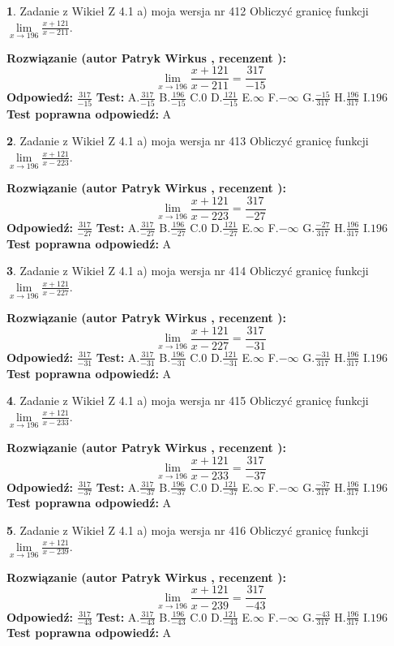 \documentclass[12pt, a4paper]{article}
\theoremstyle{definition} %
\newtheorem{zad}{}
\newcommand{\zadStart}[1]{\begin{zad}#1\newline}
\newcommand{\zadStop}{\end{zad}}
\newcommand{\rozwStart}[2]{\noindent \textbf{Rozwiązanie (autor #1 , recenzent #2): }\newline}
\newcommand{\rozwStop}{\newline}
\newcommand{\odpStart}{\noindent \textbf{Odpowiedź:}\newline}
\newcommand{\odpStop}{\newline}
\newcommand{\testStart}{\noindent \textbf{Test:}\newline}
\newcommand{\testStop}{\newline}
\newcommand{\kluczStart}{\noindent \textbf{Test poprawna odpowiedź:}\newline}
\newcommand{\kluczStop}{\newline}
\begin{document}
\zadStart{Zadanie z Wikieł Z 4.1 a) moja wersja nr 412}
Obliczyć granicę funkcji $\lim\limits_{x\to196}\frac{x+121}{x-211}$.
\zadStop
\rozwStart{Patryk Wirkus}{}
$$\lim\limits_{x\to196}\frac{x+121}{x-211} = \frac{317}{-15}$$
\rozwStop
\odpStart
$\frac{317}{-15}$
\odpStop
\testStart
A.$\frac{317}{-15}$
B.$\frac{196}{-15}$
C.$0$
D.$\frac{121}{-15}$
E.$\infty$
F.$-\infty$
G.$\frac{-15}{317}$
H.$\frac{196}{317}$
I.$196$
\testStop
\kluczStart
A
\kluczStop



\zadStart{Zadanie z Wikieł Z 4.1 a) moja wersja nr 413}
Obliczyć granicę funkcji $\lim\limits_{x\to196}\frac{x+121}{x-223}$.
\zadStop
\rozwStart{Patryk Wirkus}{}
$$\lim\limits_{x\to196}\frac{x+121}{x-223} = \frac{317}{-27}$$
\rozwStop
\odpStart
$\frac{317}{-27}$
\odpStop
\testStart
A.$\frac{317}{-27}$
B.$\frac{196}{-27}$
C.$0$
D.$\frac{121}{-27}$
E.$\infty$
F.$-\infty$
G.$\frac{-27}{317}$
H.$\frac{196}{317}$
I.$196$
\testStop
\kluczStart
A
\kluczStop



\zadStart{Zadanie z Wikieł Z 4.1 a) moja wersja nr 414}
Obliczyć granicę funkcji $\lim\limits_{x\to196}\frac{x+121}{x-227}$.
\zadStop
\rozwStart{Patryk Wirkus}{}
$$\lim\limits_{x\to196}\frac{x+121}{x-227} = \frac{317}{-31}$$
\rozwStop
\odpStart
$\frac{317}{-31}$
\odpStop
\testStart
A.$\frac{317}{-31}$
B.$\frac{196}{-31}$
C.$0$
D.$\frac{121}{-31}$
E.$\infty$
F.$-\infty$
G.$\frac{-31}{317}$
H.$\frac{196}{317}$
I.$196$
\testStop
\kluczStart
A
\kluczStop



\zadStart{Zadanie z Wikieł Z 4.1 a) moja wersja nr 415}
Obliczyć granicę funkcji $\lim\limits_{x\to196}\frac{x+121}{x-233}$.
\zadStop
\rozwStart{Patryk Wirkus}{}
$$\lim\limits_{x\to196}\frac{x+121}{x-233} = \frac{317}{-37}$$
\rozwStop
\odpStart
$\frac{317}{-37}$
\odpStop
\testStart
A.$\frac{317}{-37}$
B.$\frac{196}{-37}$
C.$0$
D.$\frac{121}{-37}$
E.$\infty$
F.$-\infty$
G.$\frac{-37}{317}$
H.$\frac{196}{317}$
I.$196$
\testStop
\kluczStart
A
\kluczStop



\zadStart{Zadanie z Wikieł Z 4.1 a) moja wersja nr 416}
Obliczyć granicę funkcji $\lim\limits_{x\to196}\frac{x+121}{x-239}$.
\zadStop
\rozwStart{Patryk Wirkus}{}
$$\lim\limits_{x\to196}\frac{x+121}{x-239} = \frac{317}{-43}$$
\rozwStop
\odpStart
$\frac{317}{-43}$
\odpStop
\testStart
A.$\frac{317}{-43}$
B.$\frac{196}{-43}$
C.$0$
D.$\frac{121}{-43}$
E.$\infty$
F.$-\infty$
G.$\frac{-43}{317}$
H.$\frac{196}{317}$
I.$196$
\testStop
\kluczStart
A
\kluczStop
\end{document}
